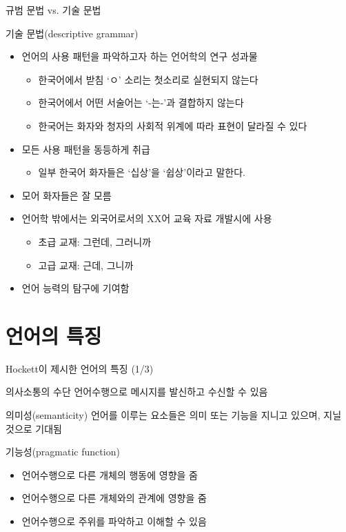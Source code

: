 \documentclass[11pt, aspectratio=169]{beamer}
\begin{document}
\begin{frame}[t]{규범 문법 vs. 기술 문법}
  \begin{block}{기술 문법(descriptive grammar)}
    \begin{itemize}
      \item 언어의 사용 패턴을 파악하고자 하는 언어학의 연구 성과물
        \begin{itemize}
          \item 한국어에서 받침 ‘ㅇ’ 소리는 첫소리로 실현되지 않는다 
          \item 한국어에서 어떤 서술어는 ‘-는-’과 결합하지 않는다
          \item 한국어는 화자와 청자의 사회적 위계에 따라 표현이 달라질 수 있다
        \end{itemize}
      \item 모든 사용 패턴을 동등하게 취급
        \begin{itemize}
          \item 일부 한국어 화자들은 ‘십상’을 ‘쉽상’이라고 말한다.
        \end{itemize}
      \item 모어 화자들은 잘 모름
      \item 언어학 밖에서는 외국어로서의 XX어 교육 자료 개발시에 사용
        \begin{itemize}
          \item 초급 교재: 그런데, 그러니까
          \item 고급 교재: 근데, 그니까
        \end{itemize}
      \item 언어 능력의 탐구에 기여함
    \end{itemize}
  \end{block}  
\end{frame}

\section{언어의 특징}

\begin{frame}[t]{Hockett이 제시한 언어의 특징 (1/3)}
  \begin{block}{의사소통의 수단}
    언어수행으로 메시지를 발신하고 수신할 수 있음
  \end{block}
  \begin{block}{의미성(semanticity)}
    언어를 이루는 요소들은 의미 또는 기능을 지니고 있으며, 지닐 것으로 기대됨
  \end{block}
  \begin{block}{기능성(pragmatic function)}
    \begin{itemize}
      \item 언어수행으로 다른 개체의 행동에 영향을 줌
      \item 언어수행으로 다른 개체와의 관계에 영향을 줌
      \item 언어수행으로 주위를 파악하고 이해할 수 있음
    \end{itemize}
  \end{block}
\end{frame}
\end{document}
